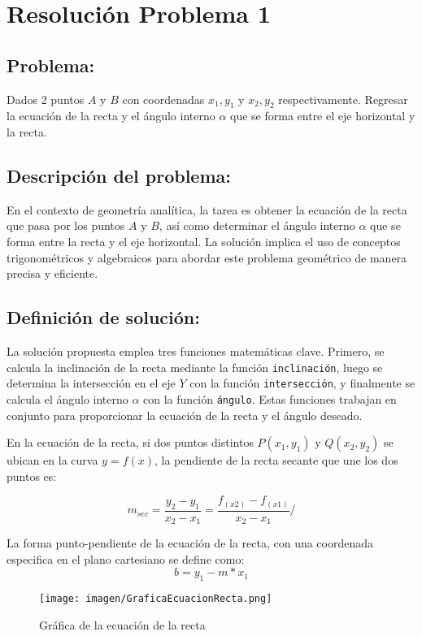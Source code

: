 \section{Resolución Problema 1} 
\subsection{Problema:}
Dados 2 puntos $A \mbox{ y } B$ con coordenadas $x_{1}, y_{1}$ y $x_{2}, y_{2}$  respectivamente. Regresar la ecuación de la recta y el ángulo interno $\alpha$ que se forma entre el eje horizontal y la recta. 

\subsection{\textbf{Descripción del problema:}}
En el contexto de geometría analítica, la tarea es obtener la ecuación de la recta que pasa por los puntos $A$ y $B$, así como determinar el ángulo interno $\alpha$ que se forma entre la recta y el eje horizontal. La solución implica el uso de conceptos trigonométricos y algebraicos para abordar este problema geométrico de manera precisa y eficiente.

\subsection{\textbf{Definición de solución:}}
La solución propuesta emplea tres funciones matemáticas clave. Primero, se calcula la inclinación de la recta mediante la función \texttt{inclinación}, luego se determina la intersección en el eje $Y$ con la función \texttt{intersección}, y finalmente se calcula el ángulo interno $\alpha$ con la función \texttt{ángulo}. Estas funciones trabajan en conjunto para proporcionar la ecuación de la recta y el ángulo deseado.

En la ecuación de la recta, si dos puntos distintos $P(x_{1}, y_{1})$ y $Q(x_{2}, y_{2})$ se ubican en la curva $y=f(x)$, la pendiente de la recta secante que une los dos puntos es:

\begin{equation}
    m_{sec}=\frac{y_{2} - y_{1}}{x_{2} - x_{1}} = \frac{f_{(x2)} - f_{(x1)} }{x_{2} - x_{1}}/
    \label{eqn:rectaPendiente}
\end{equation}

La forma punto-pendiente de la ecuación de la recta, con una coordenada especifica en el plano cartesiano se define como:
\begin{equation}
    b = y_{1} - m * x_{1}
     \label{eqn:eqnRecta}
\end{equation}
\begin{figure}[h!]
    \centering
    \texttt{[image: imagen/GraficaEcuacionRecta.png]}
    \caption{Gráfica de la ecuación de la recta}
    \label{fig:GraficaEcuacionRecta}
\end{figure}


